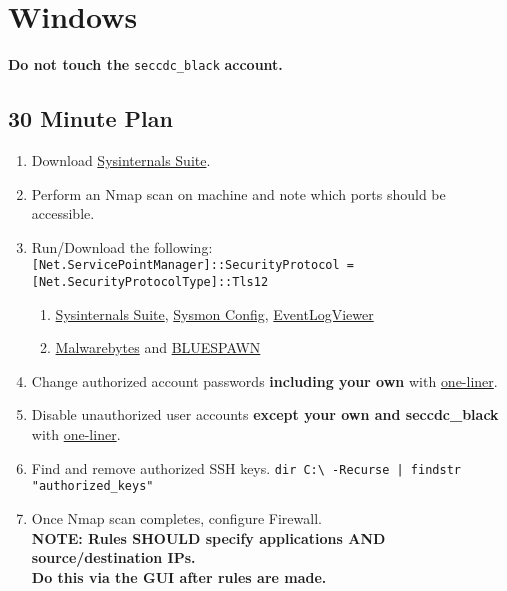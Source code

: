 \documentclass[12pt,letterpaper]{article}
\def\code#1{\textcolor{iris}{\texttt{#1}}}
\def\bf#1{\textbf{#1}}
\begin{document}
\pagebreak

\section{Windows}

\bf{Do not touch the} \code{seccdc\_black} \bf{account.}

\subsection{30 Minute Plan}

\begin{enumerate}
	\item Download \href{https://download.sysinternals.com/files/SysinternalsSuite.zip}{Sysinternals Suite}.
	\item Perform an Nmap scan on machine and note which ports should be accessible.
	\item Run/Download the following: \\
		\code{[Net.ServicePointManager]::SecurityProtocol = [Net.SecurityProtocolType]::Tls12}
		\begin{enumerate}
			\item \href{https://download.sysinternals.com/files/SysinternalsSuite.zip}{Sysinternals Suite}, \href{https://raw.githubusercontent.com/D42H5/cyber\_comp\_resources/main/sysmonconfig-export-modified-2-2-24.xml}{Sysmon Config}, \href{https://www.nirsoft.net/utils/fulleventlogview-x64.zip}{EventLogViewer}
			\item \href{https://downloads.malwarebytes.com/file/mb-windows}{Malwarebytes} and \href{https://github.com/ION28/BLUESPAWN/releases/download/v0.5.1-alpha/BLUESPAWN-client-x64.exe}{BLUESPAWN}
		\end{enumerate}
	\item Change authorized account passwords \bf{including your own} with \hyperref[subsec:woliner]{one-liner}.
	\item Disable unauthorized user accounts \bf{except your own and seccdc\_black} with \hyperref[subsec:woliner]{one-liner}.
	\item Find and remove authorized SSH keys.
		\code{dir C:\textbackslash{} -Recurse | findstr "authorized\_keys"}
	\item Once Nmap scan completes, configure Firewall. \\
	\bf{NOTE: Rules SHOULD specify applications AND source/destination IPs. \\Do this via the GUI after rules are made.}
		\begin{enumerate}

\end{enumerate}
\end{enumerate}
\end{document}
